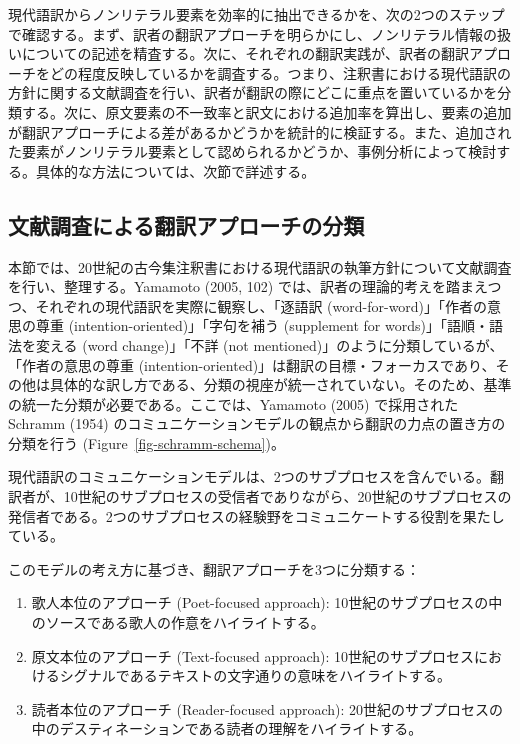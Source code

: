 \documentclass[
  letterpaper,
  DIV=11,
  numbers=noendperiod]{scrartcl}
\providecommand{\tightlist}{%
  \setlength{\itemsep}{0pt}\setlength{\parskip}{0pt}}\usepackage{longtable,booktabs,array}
\begin{document}
現代語訳からノンリテラル要素を効率的に抽出できるかを、次の2つのステップで確認する。まず、訳者の翻訳アプローチを明らかにし、ノンリテラル情報の扱いについての記述を精査する。次に、それぞれの翻訳実践が、訳者の翻訳アプローチをどの程度反映しているかを調査する。つまり、注釈書における現代語訳の方針に関する文献調査を行い、訳者が翻訳の際にどこに重点を置いているかを分類する。次に、原文要素の不一致率と訳文における追加率を算出し、要素の追加が翻訳アプローチによる差があるかどうかを統計的に検証する。また、追加された要素がノンリテラル要素として認められるかどうか、事例分析によって検討する。具体的な方法については、次節で詳述する。

\subsection{文献調査による翻訳アプローチの分類}\label{ux6587ux732eux8abfux67fbux306bux3088ux308bux7ffbux8a33ux30a2ux30d7ux30edux30fcux30c1ux306eux5206ux985e}

本節では、20世紀の古今集注釈書における現代語訳の執筆方針について文献調査を行い、整理する。Yamamoto
(2005, 102)
では、訳者の理論的考えを踏まえつつ、それぞれの現代語訳を実際に観察し、「逐語訳
(word-for-word)」「作者の意思の尊重 (intention-oriented)」「字句を補う
(supplement for words)」「語順・語法を変える (word change)」「不詳 (not
mentioned)」のように分類しているが、「作者の意思の尊重
(intention-oriented)」は翻訳の目標・フォーカスであり、その他は具体的な訳し方である、分類の視座が統一されていない。そのため、基準の統一た分類が必要である。ここでは、Yamamoto
(2005) で採用された Schramm (1954)
のコミュニケーションモデルの観点から翻訳の力点の置き方の分類を行う
(Figure~\ref{fig-schramm-schema})。

現代語訳のコミュニケーションモデルは、2つのサブプロセスを含んでいる。翻訳者が、10世紀のサブプロセスの受信者でありながら、20世紀のサブプロセスの発信者である。2つのサブプロセスの経験野をコミュニケートする役割を果たしている。

このモデルの考え方に基づき、翻訳アプローチを3つに分類する：

\begin{enumerate}
\def\labelenumi{\arabic{enumi}.}
\tightlist
\item
  歌人本位のアプローチ (Poet-focused approach):
  10世紀のサブプロセスの中のソースである歌人の作意をハイライトする。
\item
  原文本位のアプローチ (Text-focused approach):
  10世紀のサブプロセスにおけるシグナルであるテキストの文字通りの意味をハイライトする。
\item
  読者本位のアプローチ (Reader-focused approach):
  20世紀のサブプロセスの中のデスティネーションである読者の理解をハイライトする。
\end{enumerate}
\end{document}

